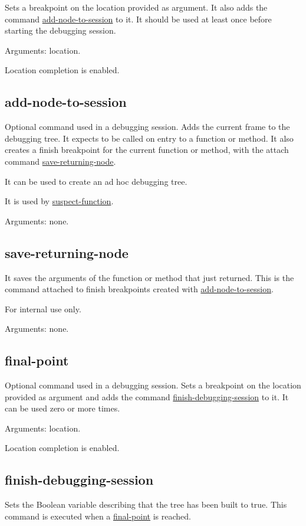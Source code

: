 Sets a breakpoint on the location provided as argument. It also adds the command \hyperref[command:add-node-to-session]{add-node-to-session} to it.
It should be used at least once before starting the debugging session.

Arguments: location.

Location completion is enabled.
\subsection{add-node-to-session}
\label{command:add-node-to-session}
Optional command used in a debugging session.
Adds the current frame to the debugging tree.
It expects to be called on entry to a function or method.
It also creates a finish breakpoint for the current function or method, with the attach command \hyperref[command:save-returning-node]{save-returning-node}.

It can be used to create an ad hoc debugging tree.

It is used by \hyperref[command:suspect-function]{suspect-function}.

Arguments: none.
\subsection{save-returning-node}
\label{command:save-returning-node}
It saves the arguments of the function or method that just returned.
This is the command attached to finish breakpoints created with \hyperref[command:add-node-to-session]{add-node-to-session}.

For internal use only.

Arguments: none.
\subsection{final-point}
\label{command:final-point}
Optional command used in a debugging session.
Sets a breakpoint on the location provided as argument and adds the command \hyperref[command:finish-debugging-session]{finish-debugging-session} to it.
It can be used zero or more times.

Arguments: location.

Location completion is enabled.
\subsection{finish-debugging-session}
\label{command:finish-debugging-session}
Sets the Boolean variable describing that the tree has been built to true.
This command is executed when a \hyperref[command:final-point]{final-point} is reached.


